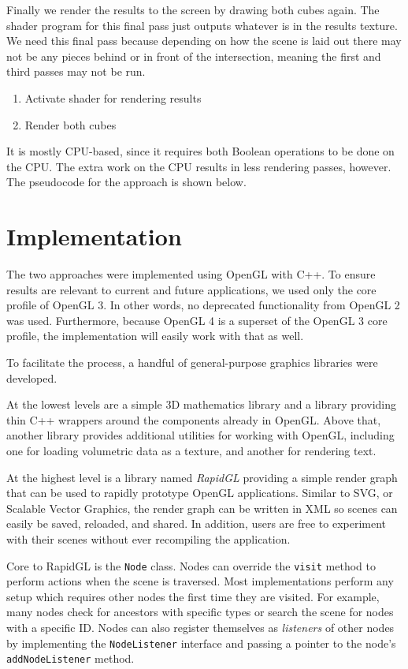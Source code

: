 \documentclass{report}
\begin{document}
Finally we render the results to the screen by drawing both cubes again.  The
shader program for this final pass just outputs whatever is in the results
texture.  We need this final pass because depending on how the scene is laid out
there may not be any pieces behind or in front of the intersection, meaning the
first and third passes may not be run.

\begin{enumerate}
  \item Activate shader for rendering results
  \item Render both cubes
\end{enumerate}

It is mostly CPU-based, since it requires both Boolean operations to be done on
the CPU.  The extra work on the CPU results in less rendering passes, however.
The pseudocode for the approach is shown below.

\chapter{Implementation}

The two approaches were implemented using OpenGL with C++.  To ensure results
are relevant to current and future applications, we used only the core profile
of OpenGL 3.  In other words, no deprecated functionality from OpenGL 2 was
used.  Furthermore, because OpenGL 4 is a superset of the OpenGL 3 core profile,
the implementation will easily work with that as well.

To facilitate the process, a handful of general-purpose graphics libraries were
developed.

At the lowest levels are a simple 3D mathematics library and a library providing
thin C++ wrappers around the components already in OpenGL.  Above that, another
library provides additional utilities for working with OpenGL, including one for
loading volumetric data as a texture, and another for rendering text.

At the highest level is a library named {\em RapidGL} providing a simple render
graph that can be used to rapidly prototype OpenGL applications.  Similar to
SVG, or Scalable Vector Graphics, the render graph can be written in XML so
scenes can easily be saved, reloaded, and shared.  In addition, users are free
to experiment with their scenes without ever recompiling the application.

Core to RapidGL is the {\tt Node} class.  Nodes can override the {\tt visit}
method to perform actions when the scene is traversed.  Most implementations
perform any setup which requires other nodes the first time they are visited.
For example, many nodes check for ancestors with specific types or search the
scene for nodes with a specific ID.  Nodes can also register themselves as {\em
listeners} of other nodes by implementing the {\tt NodeListener} interface and
passing a pointer to the node's {\tt addNodeListener} method.
\end{document}
